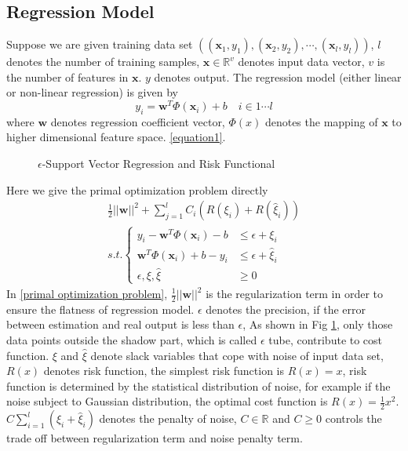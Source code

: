 \documentclass[12pt, draftclsnofoot, onecolumn]{IEEEtran}
\begin{document}
\begin{spacing}{2}
\subsection{Regression Model}
Suppose we are given training data set $((\mathbf{x}_{1}, y_{1}),(\mathbf{x}_{2},y_{2}),\cdots,(\mathbf{x}_{l},y_{l}))$, $l$ denotes the number of training samples, $\mathbf{x}\in \mathbb{R}^{v}$ denotes input data vector, $v$ is the number of features in $\mathbf{x}$. $y$ denotes output. The regression model (either linear or non-linear regression) is given by 
\begin{equation}
y_{i}=\mathbf{w}^{T}\Phi(\mathbf{x}_{i})+b  \quad i\in 1\cdots l 
\label{equation1}
\end{equation} 
where $\mathbf{w}$ denotes regression coefficient vector, $\Phi(x)$ denotes the mapping of $\mathbf{x}$ to higher dimensional feature space. \ref{equation1}.

\begin{figure}
\centering
\def\svgwidth{\columnwidth}

\caption{$\epsilon$-Support Vector Regression and Risk Functional}
\label{epsilon-SVR}
\end{figure}

Here we give the primal optimization problem directly
\begin{eqnarray}
\nonumber
\frac{1}{2}||\mathbf{w}||^{2}+\sum_{j=1}^{l}C_{i}(R(\xi_{i})+R(\hat{\xi}_{i}))\\
s.t. \left\{\begin{array}{ll}
y_{i}-\mathbf{w}^{T}\Phi(\mathbf{x}_{i})-b &\leq \epsilon+\xi_{i}\\
\mathbf{w}^{T}\Phi(\mathbf{x}_{i})+b-y_{i} &\leq \epsilon+\hat{\xi}_{i}\\
\epsilon, \xi,\hat{\xi} &\geq 0
\end{array}\right.
\label{primal optimization problem}
\end{eqnarray}
In \ref{primal optimization problem}, $\frac{1}{2}||\mathbf{w}||^{2}$ is the regularization term in order to ensure the flatness of regression model. $\epsilon$ denotes the precision, if the error between estimation and real output is less than $\epsilon$, As shown in Fig \ref{epsilon-SVR}, only those data points outside the shadow part, which is called $\epsilon$ tube, contribute to cost function. $\xi$ and $\hat{\xi}$ denote slack variables that cope with noise of input data set, $R(x)$ denotes risk function, the simplest risk function is $R(x)=x$, risk function is determined by the statistical distribution of noise\cite{smola2004tutorial}, for example if the noise subject to Gaussian distribution, the optimal cost function is $R(x)=\frac{1}{2}x^{2}$. $C\sum_{i=1}^{l}(\xi_{i}+\hat{\xi}_{i})$ denotes the penalty of noise, $C\in \mathbb{R}$ and $C\geq 0$ controls the trade off between regularization term and noise penalty term.

\end{spacing}
\end{document}
